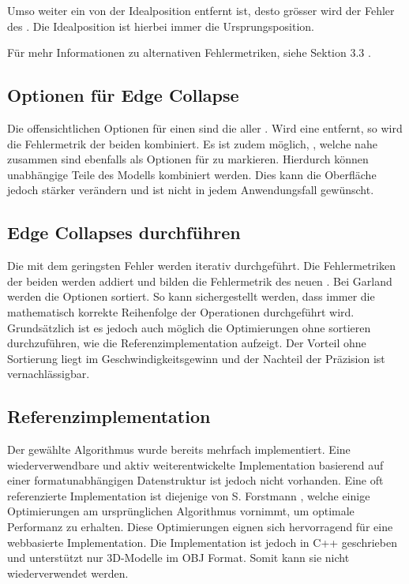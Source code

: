 Umso weiter ein  von der Idealposition entfernt ist, desto grösser wird der Fehler des . Die Idealposition ist hierbei immer die Ursprungsposition.

Für mehr Informationen zu alternativen Fehlermetriken, siehe  Sektion 3.3 \cite{quadridBasedSurfaceSimplification}.

\subsection{Optionen für Edge Collapse}

Die offensichtlichen Optionen für einen  sind die  aller . Wird eine  entfernt, so wird die Fehlermetrik der beiden  kombiniert.
Es ist zudem möglich, , welche nahe zusammen sind ebenfalls als Optionen für  zu markieren. Hierdurch können unabhängige Teile des Modells kombiniert werden. Dies kann die Oberfläche jedoch stärker verändern und ist nicht in jedem Anwendungsfall gewünscht.

\subsection{Edge Collapses durchführen}

Die  mit dem geringsten Fehler werden iterativ durchgeführt. Die Fehlermetriken der beiden  werden addiert und bilden die Fehlermetrik des neuen . Bei Garland werden die Optionen sortiert. So kann sichergestellt werden, dass immer die mathematisch korrekte Reihenfolge der Operationen durchgeführt wird. Grundsätzlich ist es jedoch auch möglich die Optimierungen ohne sortieren durchzuführen, wie die Referenzimplementation aufzeigt. Der Vorteil ohne Sortierung liegt im Geschwindigkeitsgewinn und der Nachteil der Präzision ist vernachlässigbar.

\subsection{Referenzimplementation}
Der gewählte Algorithmus wurde bereits mehrfach implementiert. Eine wiederverwendbare und aktiv weiterentwickelte Implementation basierend auf einer formatunabhängigen Datenstruktur ist jedoch nicht vorhanden. Eine oft referenzierte Implementation ist diejenige von S. Forstmann \cite{fastQuadricMeshSimplification}, welche einige Optimierungen am ursprünglichen Algorithmus vornimmt, um optimale Performanz zu erhalten. Diese Optimierungen eignen sich hervorragend für eine webbasierte Implementation. Die Implementation ist jedoch in C++ geschrieben und unterstützt nur 3D-Modelle im OBJ Format. Somit kann sie nicht wiederverwendet werden.

